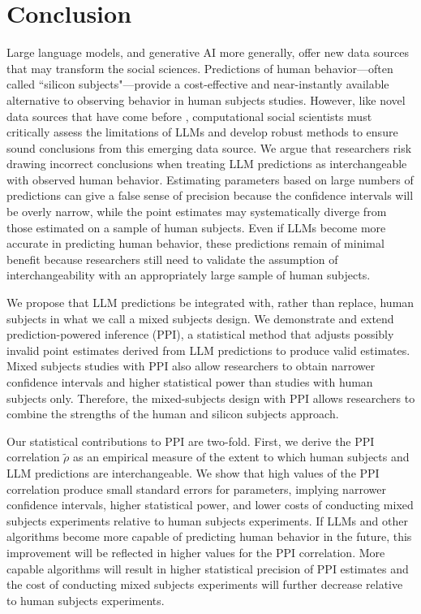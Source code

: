 \documentclass{article}
\begin{document}
\section{Conclusion}

Large language models, and generative AI more generally, offer new data sources that may transform the social sciences. Predictions of human behavior---often called ``silicon subjects"---provide a cost-effective and near-instantly available alternative to observing behavior in human subjects studies. However, like novel data sources that have come before \citep{lazer2009css,lazer_computational_2020}, computational social scientists must critically assess the limitations of LLMs and develop robust methods to ensure sound conclusions from this emerging data source. We argue that researchers risk drawing incorrect conclusions when treating LLM predictions as interchangeable with observed human behavior. Estimating parameters based on large numbers of predictions can give a false sense of precision because the confidence intervals will be overly narrow, while the point estimates may systematically diverge from those estimated on a sample of human subjects. Even if LLMs become more accurate in predicting human behavior, these predictions remain of minimal benefit because researchers still need to validate the assumption of interchangeability with an appropriately large sample of human subjects.

We propose that LLM predictions be integrated with, rather than replace, human subjects in what we call a mixed subjects design. We demonstrate and extend prediction-powered inference (PPI), a statistical method that adjusts possibly invalid point estimates derived from LLM predictions to produce valid estimates. Mixed subjects studies with PPI also allow researchers to obtain narrower confidence intervals and higher statistical power than studies with human subjects only. Therefore, the mixed-subjects design with PPI allows researchers to combine the strengths of the human and silicon subjects approach.

Our statistical contributions to PPI are two-fold. First, we derive the PPI correlation $\tilde{\rho}$ as an empirical measure of the extent to which human subjects and LLM predictions are interchangeable. We show that high values of the PPI correlation produce small standard errors for parameters, implying narrower confidence intervals, higher statistical power, and lower costs of conducting mixed subjects experiments relative to human subjects experiments. If LLMs and other algorithms become more capable of predicting human behavior in the future, this improvement will be reflected in higher values for the PPI correlation. More capable algorithms will result in higher statistical precision of PPI estimates and the cost of conducting mixed subjects experiments will further decrease relative to human subjects experiments. 
\end{document}
